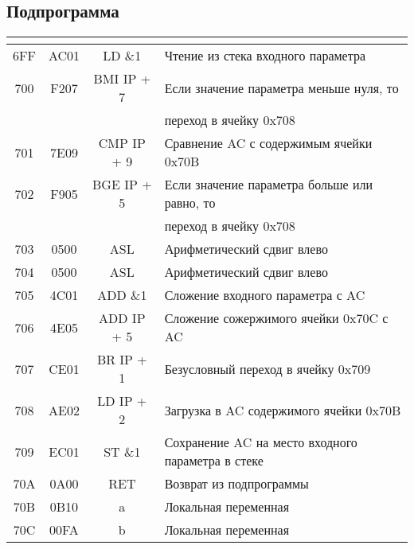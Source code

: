 \subsection{Подпрограмма}
\begin{center}
	\begin{tabular}{|c|c|c|l|}
		\hline
		&
		&
		&\\
		\hline
		6FF & AC01 & LD \&1 & Чтение из стека входного параметра \\

		700 & F207 & BMI IP + 7 & Если значение параметра меньше нуля, то\\ & & & переход в ячейку 0x708 \\
		701 & 7E09 & CMP IP + 9 & Сравнение AC с содержимым ячейки 0x70B \\

		702 & F905 & BGE IP + 5 & Если значение параметра больше или равно, то\\ & & & переход в ячейку 0x708 \\

		703 & 0500 & ASL & Арифметический сдвиг влево \\

		704 & 0500 & ASL & Арифметический сдвиг влево \\

		705 & 4C01 & ADD \&1 & Сложение входного параметра с AC \\

		706 & 4E05 & ADD IP + 5 & Сложение сожержимого ячейки 0x70C с AC \\
		707 & CE01 & BR IP + 1 & Безусловный переход в ячейку 0x709 \\

		708 & AE02 & LD IP + 2 & Загрузка в AC содержимого ячейки 0x70B\\
		709 & EC01 & ST \&1 & Сохранение AC на место входного параметра в стеке \\
		70A & 0A00 & RET & Возврат из подпрограммы \\
		\hline
		70B & 0B10 & a & Локальная переменная \\

		70C & 00FA & b & Локальная переменная \\
		\hline	
	\end{tabular}
\end{center}


